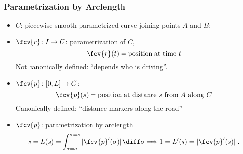 \begin{frame}
\frametitle{Parametrization by Arclength}
\begin{itemize}
\item $C$: piecewise smooth parametrized curve joining points $A$ and $B$;
\item $\fcv{r} \colon I \to C$: parametrization of $C$,
$$\fcv{r}(t) = \text{position at time }t$$
Not canonically defined: ``depends who is driving''.
\item<2-> $\fcv{p} \colon [0,L] \to C$:
$$\fcv{p}(s) = \text{position at distance } s \text{ from }A \text{ along } C$$ Canonically defined: ``distance markers along the road''.
\item<3-> $\fcv{p}$: parametrization by arclength
$$s=L(s) = \int_{\sigma=a}^{\sigma=s} |\fcv{p}'(\sigma)| \, \diff \sigma \Longrightarrow 1 = L'(s) = |\fcv{p}'(s)|\; .$$
\end{itemize}
\end{frame}